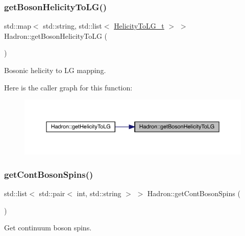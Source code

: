 \subsubsection{\texorpdfstring{getBosonHelicityToLG()}{getBosonHelicityToLG()}}
{\footnotesize\ttfamily std\+::map$<$ std\+::string, std\+::list$<$ \mbox{\hyperlink{structHadron_1_1HelicityToLG__t}{Helicity\+To\+L\+G\+\_\+t}} $>$ $>$ Hadron\+::get\+Boson\+Helicity\+To\+LG (\begin{DoxyParamCaption}{ }\end{DoxyParamCaption})}



Bosonic helicity to LG mapping. 

Here is the caller graph for this function\+:\nopagebreak
\begin{figure}[H]
\begin{center}
\leavevmode
\includegraphics[width=350pt]{d1/daf/namespaceHadron_a82bbcfd69a36dd0f63d6181069ff7393_icgraph}
\end{center}
\end{figure}
\mbox{\label{namespaceHadron_a758e677215948a2af60fc6fee269d410}} 
\subsubsection{\texorpdfstring{getContBosonSpins()}{getContBosonSpins()}}
{\footnotesize\ttfamily std\+::list$<$ std\+::pair$<$ int, std\+::string $>$ $>$ Hadron\+::get\+Cont\+Boson\+Spins (\begin{DoxyParamCaption}{ }\end{DoxyParamCaption})}



Get continuum boson spins. 

\mbox{\label{namespaceHadron_a7131ce7dd50310f2beeabb2a83dde484}} 
